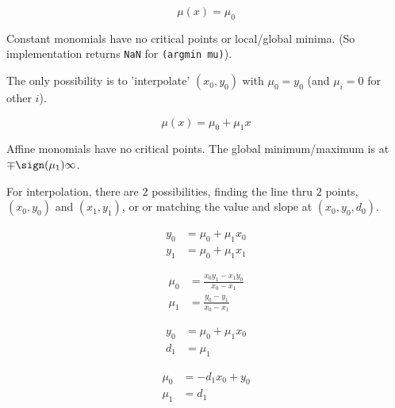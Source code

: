 
\begin{equation}
\mu(x) = \mu_0
\end{equation}

Constant monomials have no critical points or local/global
minima. 
(So implementation returns \texttt{NaN} for \texttt{(argmin mu)}).

The only possibility is to 'interpolate' $(x_0,y_0)$ with
$\mu_0 = y_0$ (and $\mu_i = 0$ for other $i$). 


\begin{equation}
\mu(x) = \mu_0 + \mu_1 x
\end{equation}

Affine monomials have no critical points.
The global minimum/maximum is at $\mp \sign(\mu_1) \infty$.

For interpolation, there are $2$ possibilities, finding the line thru $2$
points, $(x_0,y_0)$ and $(x_1,y_1)$, or or matching the value and slope at
$(x_0,y_0,d_0)$.


\begin{align}
  y_0 & = \mu_0+\mu_1 x_0  \\
   y_1 & = \mu_0+\mu_1 x_1  
\end{align}

 
\begin{align}
  \mu_0 & = \frac
{x_0 y_1 - x_1 y_0}
{x_0 - x_1} \\
   \mu_1 & = \frac
{y_0 - y_1}
{x_0 - x_1} 
\end{align}


\begin{align}
  y_0 & = \mu_0+\mu_1 x_0  \\
   d_1 & = \mu_1  
\end{align}

 
\begin{align}
  \mu_0 & =  - d_1 x_0+y_0  \\
   \mu_1 & = d_1  
\end{align}

